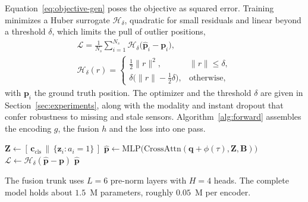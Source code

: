 Equation~\eqref{eq:objective-gen} poses the objective as squared error. Training
minimizes a Huber surrogate $\mathcal{H}_\delta$, quadratic for small residuals and
linear beyond a threshold $\delta$, which limits the pull of outlier positions,
\begin{equation}\label{eq:loss}
  \begin{gathered}
    \mathcal{L} = \frac{1}{N_s}\sum_{i=1}^{N_s}
      \mathcal{H}_\delta\big(\hat{\mathbf{p}}_i - \mathbf{p}_i\big),\\
    \mathcal{H}_\delta(r) =
    \begin{cases}
      \tfrac12 \lVert r\rVert^2, & \lVert r\rVert \le \delta,\\[2pt]
      \delta\big(\lVert r\rVert - \tfrac12\delta\big), & \text{otherwise,}
    \end{cases}
  \end{gathered}
\end{equation}
with $\mathbf{p}_i$ the ground truth position. The optimizer and the threshold
$\delta$ are given in Section~\ref{sec:experiments}, along with the modality and
instant dropout that confer robustness to missing and stale sensors.
Algorithm~\ref{alg:forward} assembles the encoding $g$, the fusion $h$ and the
loss into one pass.

\begin{algorithm}[!h]
\caption{Forward pass and training loss. The encoding $g$ builds the token set;
  the fusion $h$ contextualizes it and reads out the position, so
  $\hat{\mathbf{p}} = h(g(\mathcal{O})) = f(\mathcal{O})$.}\label{alg:forward}
\SetAlgoLined
\DontPrintSemicolon
{}
$\mathbf{Z} \leftarrow [\,\mathbf{c}_{\mathrm{cls}} \,\|\,
  \{\mathbf{z}_i : a_i = 1\}\,]$ 
$\hat{\mathbf{p}} \leftarrow
  \mathrm{MLP}\big(\mathrm{CrossAttn}(\mathbf{q} + \phi(\tau), \mathbf{Z},
  \mathbf{B})\big)$ 
$\mathcal{L} \leftarrow \mathcal{H}_\delta(\hat{\mathbf{p}} - \mathbf{p})$
\Return $\hat{\mathbf{p}}$\;
\end{algorithm}

The fusion trunk uses $L=6$ pre-norm layers with $H=4$ heads. The complete model
holds about $1.5$~M parameters, roughly $0.05$~M per encoder.
